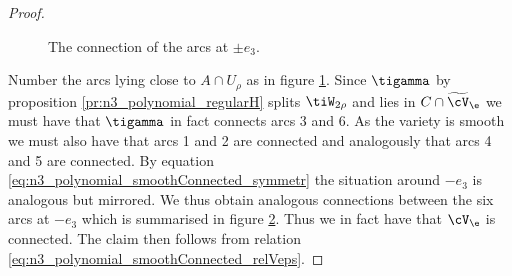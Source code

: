 \begin{proof}
\begin{figure}
    \label{fi:n3_polynomial_arcNumbering}
  \end{figure}
  \begin{figure}
    \centering
    
    \caption{The connection of the arcs at $\pm e_3$.}
    \label{fi:n3_polynomial_arcConnections}
  \end{figure}
  Number the arcs lying close to $A\cap U_\rho$ as in figure \ref{fi:n3_polynomial_arcNumbering}.
  Since $\tigamma$ by proposition \ref{pr:n3_polynomial_regularH} splits $\tiW_{2\rho}$ and lies in $C\cap\widetilde{\cV}_\e$ we must have that
  $\tigamma$ in fact connects arcs 3 and 6.
  As the variety is smooth we must also have that arcs 1 and 2 are connected
  and analogously that arcs 4 and 5 are connected.
  By equation \eqref{eq:n3_polynomial_smoothConnected_symmetr} the situation around $-e_3$ is analogous but mirrored.
  We thus obtain analogous connections between the six arcs at $-e_3$ which is summarised in figure \ref{fi:n3_polynomial_arcConnections}.
  Thus we in fact have that $\cV_\e$ is connected.
  The claim then follows from relation \eqref{eq:n3_polynomial_smoothConnected_relVeps}.
\end{proof}

